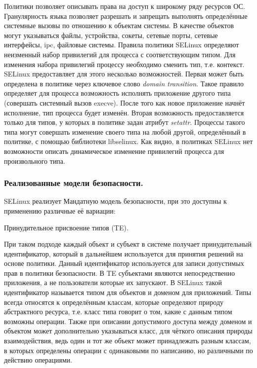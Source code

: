 Политики позволяет описывать права на доступ к широкому ряду ресурсов
ОС. Гранулярность языка позволяет разрешать и запрещать выполнять
определённые системные вызовы по отношению к объектам системы. В
качестве объектов могут указываться файлы, устройства, сокеты, сетевые
порты, сетевые интерфейсы, ipc, файловые системы.  Правила политики
SELinux определяют неизменный набор привилегий для процесса с
соответствующим типом. Для изменения набора привилегий процессу
необходимо сменить тип, т.е. контекст. SELinux предоставляет для этого
несколько возможностей. Первая может быть определена в политике через
ключевое слово \emph{domain transition}. Такое правило определяет для
процесса возможность исполнять приложение другого типа (совершать
системный вызов execve). После того как новое приложение начнёт
исполнение, тип процесса будет изменён. Вторая возможность
предоставляется только для типов, у которых в политике задан атрибут
\emph{setattr}. Процессы такого типа могут совершать изменение своего
типа на любой другой, определённый в политике, с помощью библиотеки
libselinux.  Как видно, в политиках SELinux нет возможности описать
динамическое изменение привилегий процесса для произвольного типа.

\subsubsection {Реализованные модели безопасности.} 
SELinux реализует Мандатную модель безопасности, при это доступны к
применению различные её вариации:

Принудительное присвоение типов (TE). 

При таком подходе каждый объект и субъект в системе получает
принудительный идентификатор, который в дальнейшем используется для
принятия решений на основе политики. Данный идентификатор используется
для записи допустимых прав в политики безопасности. В TE субъектами
являются непосредственно приложения, а не пользователи которые их
запускают. В SELinux такой идентификатор называется типом для объектов и
доменом для приложений.  Типы всегда относятся к определённым классам,
которые определяют природу абстрактного ресурса, т.е. класс типа говорит
о том, какие с данным типом возможны операции. Также при описании
допустимого доступа между доменом и объектом может дополнительно
указываться класс, для чёткого описания природы взаимодействия, ведь
один и тот же объект может принадлежать разным классам, в которых
определены операции с одинаковыми по написанию, но различными по
действию операциями.

